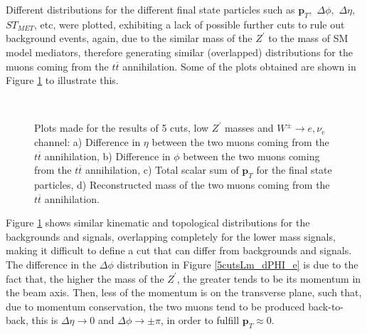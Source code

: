 Different distributions for the different final state particles such as $\bm{p}_T,$ $\Delta \phi,$ $\Delta \eta,$ $ST_{MET}$, etc, were plotted, exhibiting a lack of possible further cuts to rule out background events, again, due to the similar mass of the $Z^{\prime}$ to the mass of SM model mediators, therefore generating similar (overlapped) distributions for the muons coming from the $t\overline t$ annihilation. Some of the plots obtained are shown in Figure \ref{5cutsLm_Results_e} to illustrate this.

\begin{figure}[ht!]
     \begin{center}
        \\
    \end{center}
    \vspace{-1\baselineskip}
    \caption{Plots made for the results of 5 cuts, low $Z^{\prime}$ masses and $W^{\pm}\rightarrow e, \nu_e$ channel: a) Difference in $\eta$ between the two muons coming from the $t\overline t$ annihilation, b) Difference in $\phi$ between the two muons coming from the $t\overline t$ annihilation, c) Total scalar sum of $\bm{p}_T$ for the final state particles, d) Reconstructed mass of the two muons coming from the $t\overline t$ annihilation.} 
   \label{5cutsLm_Results_e}
\end{figure}

Figure \ref{5cutsLm_Results_e} shows similar kinematic and topological distributions for the backgrounds and signals, overlapping completely for the lower mass signals, making it difficult to define a cut that can differ from backgrounds and signals. The difference in the $\Delta \phi$ distribution in Figure \ref{5cutsLm_dPHI_e} is due to the fact that, the higher the mass of the $Z^{\prime}$, the greater tends to be its momentum in the beam axis. Then, less of the momentum is on the transverse plane, such that, due to momentum conservation, the two muons tend to be produced back-to-back, this is $\Delta \eta \rightarrow 0$ and $\Delta \phi \rightarrow \pm\pi$, in order to fulfill $\bm{p}_T \approx 0$.

